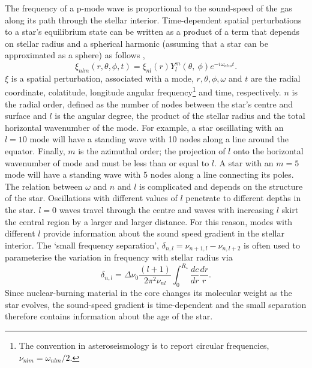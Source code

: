 The frequency of a p-mode wave is proportional to the sound-speed of the gas
along its path through the stellar interior.
Time-dependent spatial perturbations to a star's equilibrium state can be
written as a product of a term that depends on stellar radius and a spherical
harmonic (assuming that a star can be approximated as a sphere) as follows
\citep{Brown1994},
\begin{equation}
    \xi_{nlm}(r, \theta, \phi, t) = \xi_{nl}(r)Y_l^m(\theta, \
    \phi)e^{-i\omega_{nlm}t}.
\end{equation}
$\xi$ is a spatial perturbation, associated with a mode, $r, \theta, \phi,
\omega$ and $t$ are the radial coordinate, colatitude, longitude angular
frequency\footnote{The convention in asteroseismology is to report circular
frequencies, $\nu_{nlm} = \omega_{nlm}/2$.} and time, respectively.
$n$ is the radial order, defined as the number of nodes between the star's
centre and surface and $l$ is the angular degree, the product of the stellar
radius and the total horizontal wavenumber of the mode.
For example, a star oscillating with an $l = 10$ mode will have a standing
wave with 10 nodes along a line around the equator.
Finally, $m$ is the azimuthal order; the projection of $l$ onto the horizontal
wavenumber of mode and must be less than or equal to $l$.
A star with an $m = 5$ mode will have a standing wave with 5 nodes along a
line connecting its poles.
The relation between $\omega$ and $n$ and $l$ is complicated and depends on the
structure of the star.
Oscillations with different values of $l$ penetrate to different depths in the
star.
$l = 0$ waves travel through the centre and waves with increasing $l$ skirt
the central region by a larger and larger distance.
For this reason, modes with different $l$ provide information about the sound
speed gradient in the stellar interior.
The `small frequency separation', $\delta_{n,l} = \nu_{n+1, l} - \nu_{n, l+2}$
is often used to parameterise the variation in frequency with stellar radius
via \citep{Brown1994}
\begin{equation}
    \delta_{n,l} = \Delta\nu_0\frac{(l + 1)}{2\pi^2\nu_{nl}}\int_0^{R_\star}
    \frac{dc}{dr}\frac{dr}{r}.
\end{equation}
Since nuclear-burning material in the core changes its molecular weight as the
star evolves, the sound-speed gradient is time-dependent and the small
separation therefore contains information about the age of the star.

